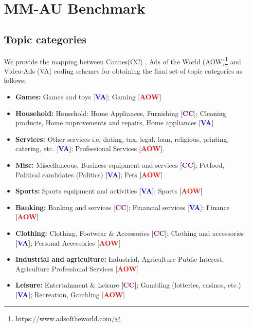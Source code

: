 \section{MM-AU Benchmark}
\label{app:topic_categories}
\subsection{Topic categories}

We provide the mapping between Cannes(CC) \cite{cannes-lions}, Ads of the World (AOW)\footnote{https://www.adsoftheworld.com/} and Video-Ads (VA) \cite{Hussain2017AutomaticUO} coding schemes for obtaining the final set of topic categories as follows:

\begin{itemize}
    \item \textbf{Games:} Games and toys [\textcolor{blue}{\textbf{VA}}]; Gaming [\textcolor{red}{\textbf{AOW}}]
    \item \textbf{Household:} Household: Home Appliances, Furnishing [\textcolor{purple}{\textbf{CC}}]; Cleaning products, Home improvements and repairs, Home appliances [\textcolor{blue}{\textbf{VA}}]
    \item \textbf{Services:} Other services i.e. dating, tax, legal, loan, religious, printing, catering, etc. [\textcolor{blue}{\textbf{VA}}]; Professional Services [\textcolor{red}{\textbf{AOW}}].
    \item \textbf{Misc:} Miscellaneous, Business equipment and services [\textcolor{purple}{\textbf{CC}}]; Petfood, Political candidates (Politics) [\textcolor{blue}{\textbf{VA}}]; Pets [\textcolor{red}{\textbf{AOW}}]
    \item \textbf{Sports:} Sports equipment and activities [\textcolor{blue}{\textbf{VA}}]; Sports [\textcolor{red}{\textbf{AOW}}]
    \item \textbf{Banking:} Banking and services [\textcolor{purple}{\textbf{CC}}]; Financial services [\textcolor{blue}{\textbf{VA}}]; Finance [\textcolor{red}{\textbf{AOW}}]
    \item \textbf{Clothing:} Clothing, Footwear \& Accessories [\textcolor{purple}{\textbf{CC}}]; Clothing and accessories [\textcolor{blue}{\textbf{VA}}]; Personal Accessories [\textcolor{red}{\textbf{AOW}}] 
    \item \textbf{Industrial and agriculture:} Industrial, Agriculture Public Interest, Agriculture Professional Services [\textcolor{red}{\textbf{AOW}}]
    \item \textbf{Leisure:} Entertainment \& Leisure [\textcolor{purple}{\textbf{CC}}]; Gambling (lotteries, casinos, etc.) [\textcolor{blue}{\textbf{VA}}]; Recreation, Gambling [\textcolor{red}{\textbf{AOW}}]

\end{itemize}
